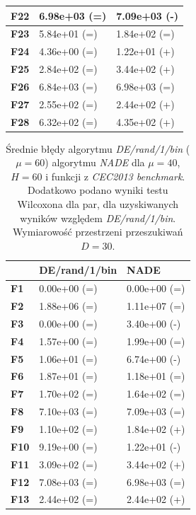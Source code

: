 \documentclass[12pt,a4paper]{report}
\begin{document}
{{{{{{{\begin{table}[h]
\begin{tabular}{|l|l|l|}
{\bf F22} & 6.98e+03 (=)        & 7.09e+03 (-)    \\ \hline
{\bf F23} & 5.84e+01 (=)        & 1.84e+02 (=)    \\ \hline
{\bf F24} & 4.36e+00 (=)        & 1.22e+01 (+)    \\ \hline
{\bf F25} & 2.84e+02 (=)        & 3.44e+02 (+)    \\ \hline
{\bf F26} & 6.84e+03 (=)        & 6.98e+03 (=)    \\ \hline
{\bf F27} & 2.55e+02 (=)        & 2.44e+02 (+)    \\ \hline
{\bf F28} & 6.32e+02 (=)        & 4.35e+02 (+)    \\ \hline
\end{tabular}
\end{table}

\begin{table}[h]
\centering
\caption{Średnie błędy algorytmu \emph{DE/rand/1/bin} ($\mu = 60$) algorytmu \emph{NADE} dla $\mu = 40$, $H = 60$ i funkcji z \emph{CEC2013 benchmark}. Dodatkowo podano wyniki testu Wilcoxona dla par, dla uzyskiwanych wyników względem \emph{DE/rand/1/bin}. Wymiarowość przestrzeni przeszukiwań $D = 30$.}
\label{Eksp4}
\begin{tabular}{|l|l|l|}
\hline
          & {\bf DE/rand/1/bin} & {\bf NADE}   \\ \hline
{\bf F1}  & 0.00e+00 (=)        & 0.00e+00 (=) \\ \hline
{\bf F2}  & 1.88e+06 (=)        & 1.11e+07 (=) \\ \hline
{\bf F3}  & 0.00e+00 (=)        & 3.40e+00 (-) \\ \hline
{\bf F4}  & 1.57e+00 (=)        & 1.99e+00 (=) \\ \hline
{\bf F5}  & 1.06e+01 (=)        & 6.74e+00 (-) \\ \hline
{\bf F6}  & 1.87e+01 (=)        & 1.18e+01 (=) \\ \hline
{\bf F7}  & 1.70e+02 (=)        & 1.64e+02 (=) \\ \hline
{\bf F8}  & 7.10e+03 (=)        & 7.09e+03 (=) \\ \hline
{\bf F9}  & 1.10e+02 (=)        & 1.84e+02 (+) \\ \hline
{\bf F10} & 9.19e+00 (=)        & 1.22e+01 (-) \\ \hline
{\bf F11} & 3.09e+02 (=)        & 3.44e+02 (+) \\ \hline
{\bf F12} & 7.08e+03 (=)        & 6.98e+03 (=) \\ \hline
{\bf F13} & 2.44e+02 (=)        & 2.44e+02 (+) \\ \hline

\end{tabular}
\end{table}}}}}}}}
\end{document}
